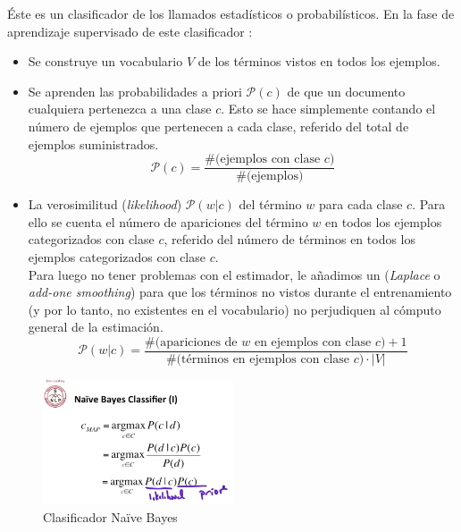 Éste es un clasificador de los llamados estadísticos o probabilísticos. En la fase de aprendizaje supervisado de este clasificador \citep{Jurafsky2015}:
\begin{itemize}
\item Se construye un vocabulario $V$ de los términos vistos en todos los ejemplos.
\item Se aprenden las probabilidades a priori $\mathcal{P}(c)$ de que un documento cualquiera pertenezca a una clase $c$. Esto se hace simplemente contando el número de ejemplos que pertenecen a cada clase, referido del total de ejemplos suministrados.
\begin{equation}
\mathcal{P}(c) = \frac{\text{\#(ejemplos con clase $c$)}}{\text{\#(ejemplos)}}
\end{equation}
\item La verosimilitud (\emph{likelihood}) $\mathcal{P}(w|c)$ del término $w$ para cada clase $c$. Para ello se cuenta el número de apariciones del término $w$ en todos los ejemplos categorizados con clase $c$, referido del número de términos en todos los ejemplos categorizados con clase $c$.\\
Para luego no tener problemas con el estimador, le añadimos un  (\emph{Laplace} o \emph{add-one smoothing}) para que los términos no vistos durante el entrenamiento (y por lo tanto, no existentes en el vocabulario) no perjudiquen al cómputo general de la estimación.
\begin{equation}
\mathcal{P}(w|c) = \frac{\text{\#(apariciones de $w$ en ejemplos con clase $c$)} + 1}%
{\text{\#(términos en ejemplos con clase $c$)} \cdot |V|}
\end{equation}
\end{itemize}

\begin{figure}[htbp]
\centering
\includegraphics[width=0.5\textwidth]{multinomialNB-clsfy}
\caption[Clasificador Naïve Bayes]{Clasificador Naïve Bayes \citep{Jurafsky2015}}
\label{fig:multinomialNB-clsfy}
\end{figure}

